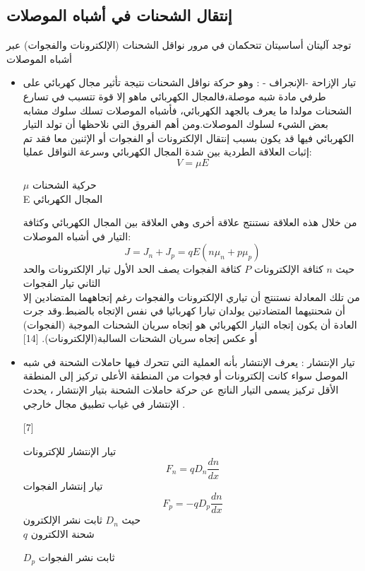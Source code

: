 	\subsection{إنتقال الشحنات في أشباه الموصلات}
	توجد آليتان أساسيتان تتحكمان في مرور نواقل الشحنات (الإلكترونات والفجوات) عبر أشباه الموصلات
	\begin{itemize}
		
		\item    تيار الإزاحة 
		-الإنجراف - 
		:
		وهو حركة نواقل الشحنات نتيجة تأثير مجال كهربائي على طرفي مادة شبه موصلة،فالمجال الكهربائي ماهو إلا قوة تتسبب في تسارع الشحنات مولدا ما يعرف بالجهد الكهربائي، فأشباه الموصلات تسلك سلوك مشابه بعض الشيء لسلوك الموصلات.ومن أهم الفروق التي نلاحظها أن تولد التيار الكهربائي فيها قد يكون بسبب إنتقال الإلكترونات أو الفجوات أو الإثنين معا
		فقد تم إثبات العلاقة الطردية بين شدة المجال الكهربائي وسرعة النواقل عمليا: 
		\begin {equation} 
		V= \mu E
		\end {equation}
		
		$\mu$ حركية الشحنات 
		\\
		E   المجال الكهربائي 
		
		من خلال هذه العلاقة  نستنتج علاقة أخرى وهي العلاقة بين المجال الكهربائي وكثافة التيار في أشباه الموصلات:
		\begin{equation} 
			J= J_n + J_p = q E (n \mu_ n + p \mu_ p )
		\end{equation}
		حيث $ n $  كثافة الإلكترونات 
		$ P $  كثافة الفجوات   
		يصف الحد الأول تيار الإلكترونات والحد الثاني تيار الفجوات
		\\  
		من تلك المعادلة نستنتج أن تياري الإلكترونات والفجوات رغم إتجاههما المتضادين إلا أن شحنتيهما المتضادتين يولدان تيارا كهربائيا في نفس الإتجاه بالضبط.وقد جرت العادة أن يكون إتجاه التيار الكهربائي هو إتجاه سريان الشحنات الموجبة (الفجوات) أو عكس إتجاه سريان الشحنات السالبة(الإلكترونات).
		[14]
		\item تيار الإنتشار  
		:
		يعرف الإنتشار بأنه العملية التي تتحرك فيها حاملات الشحنة في شبه الموصل سواء كانت إلكترونات أو فجوات من المنطقة الأعلى تركيز إلى المنطقة الأقل تركيز يسمى التيار الناتج عن حركة حاملات الشحنة بتيار الإنتشار ، يحدث الإنتشار في غياب تطبيق مجال خارجي .
		
		[7]
		
		تيار الإنتشار للإكترونات 
		\begin {equation} 
		F_n = q D_n \frac{dn}{ dx}
		\end {equation}  
		تيار إنتشار الفجوات 
		\begin {equation}
		F_p =-q D_p \frac{dn}{ dx}
		\end {equation}
		حيث
		$ D_n  $   ثابت نشر الإلكترون
		\\
		$ q $  شحنة الالكترون 
		
		$ D_p $  ثابت نشر الفجوات
	\end{itemize}
